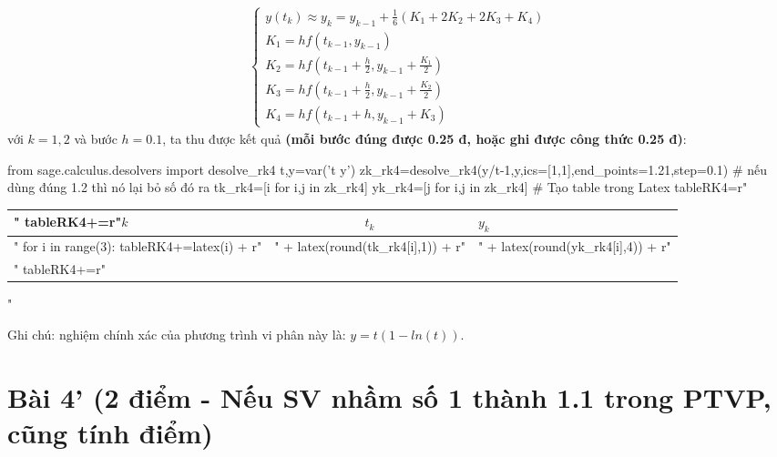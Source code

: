 \documentclass[12pt]{article}
\begin{document}
\begin{enumerate}[a).]
\begin{align*}
\left\lbrace \begin{array}{l}
               y(t_k) \approx y_k = y_{k-1} + \frac{1}{6}(K_1 + 2K_2 + 2K_3 + K_4) \\
               K_1 = h f(t_{k-1},y_{k-1}) \\
               K_2 = h f\left(t_{k-1}+\frac{h}{2},y_{k-1} + \frac{K_1}{2}\right) \\
               K_3 = h f\left(t_{k-1}+\frac{h}{2},y_{k-1} + \frac{K_2}{2}\right) \\
               K_4 = h f\left(t_{k-1}+h,y_{k-1} + K_3\right)
               \end{array}
\right.
\end{align*}
với $k=1, 2$ và bước $h=0.1$, ta thu được kết quả \textbf{(mỗi bước đúng được 0.25 đ, hoặc ghi được công thức 0.25 đ)}:
\begin{sagesilent}
 from sage.calculus.desolvers import desolve_rk4
 t,y=var('t y')
 zk_rk4=desolve_rk4(y/t-1,y,ics=[1,1],end_points=1.21,step=0.1) # nếu dùng đúng 1.2 thì nó lại bỏ số đó ra
 tk_rk4=[i for i,j in zk_rk4]
 yk_rk4=[j for i,j in zk_rk4]
 # Tạo table trong Latex
 tableRK4=r"\begin{tabular}{l|c|l}"
 tableRK4+=r"$k$ & $t_k$ & $y_k$ \\ \hline"
 for i in range(3):
   tableRK4+=latex(i) + r"&" + latex(round(tk_rk4[i],1)) + r"&" + latex(round(yk_rk4[i],4)) + r"\\"
 tableRK4+=r"\end{tabular}"
\end{sagesilent}

  \begin{center}  \end{center} 

  Ghi chú: nghiệm chính xác của phương trình vi phân này là: $y=t(1-ln(t))$.

\end{enumerate}


\section{Bài 4' (2 điểm -  Nếu SV nhầm số 1 thành 1.1 trong PTVP, cũng tính điểm)}
\end{document}
